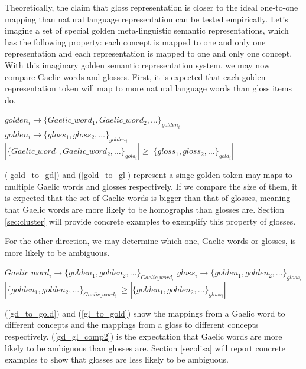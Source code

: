 \documentclass[final]{ua-thesis}
\numberwithin{equation}{section}
\begin{document}
Theoretically, the claim that gloss representation is closer to the ideal one-to-one mapping than natural language representation can be tested empirically. 
Let's imagine a set of special golden meta-linguistic semantic representations, which has the following property: each concept is mapped to one and only one representation and each representation is mapped to one and only one concept. With this imaginary golden semantic representation system, we may now compare Gaelic words and glosses. First, it is expected that each golden representation token will map to more natural language words than gloss items do.

\begin{exe}
\ex
	\begin{xlist}
	\ex \label{gold_to_gd} $golden_i \rightarrow \{Gaelic\_word_1, Gaelic\_word_2, \ldots\}_{golden_i}$
	\ex\label{gold_to_gl} $golden_i \rightarrow \{gloss_1, gloss_2, \ldots\}_{golden_i}$
	\ex\label{gd_gl_comp1}$ |\{Gaelic\_word_1, Gaelic\_word_2, \ldots\}_{gold_i}| \geq |\{gloss_1, gloss_2, \ldots\}_{gold_i}|$
	\end{xlist}
\end{exe}

(\ref{gold_to_gd}) and (\ref{gold_to_gl}) represent a singe golden token may maps to multiple Gaelic words and glosses respectively. If we compare the size of them, it is expected that the set of Gaelic words is bigger than that of glosses, meaning that Gaelic words are more likely to be homographs than glosses are. Section \ref{sec:cluster} will provide concrete examples to exemplify this property of glosses. 

For the other direction, we may determine which one, Gaelic words or glosses, is more likely to be ambiguous.   

\begin{exe}
\ex
	\begin{xlist}
	\ex \label{gd_to_gold} $Gaelic\_word_i \rightarrow \{golden_1, golden_2, \ldots\}_{Gaelic\_word_i}$
	\ex \label{gl_to_gold} $gloss_i \rightarrow \{golden_1, golden_2, \ldots\}_{gloss_i}$
	\ex\label{gd_gl_comp2}$ |\{golden_1, golden_2, \ldots\}_{Gaelic\_word_i}| \geq |\{golden_1, golden_2, \ldots\}_{gloss_i}|$
	\end{xlist}
\end{exe}

(\ref{gd_to_gold}) and (\ref{gl_to_gold}) show the mappings from a Gaelic word to different concepts and the mappings from a gloss to different concepts respectively. 
(\ref{gd_gl_comp2}) is the expectation that Gaelic words are more likely to be ambiguous than glosses are. Section \ref{sec:disa} will report concrete examples to show that glosses are less likely to be ambiguous.
\end{document}
